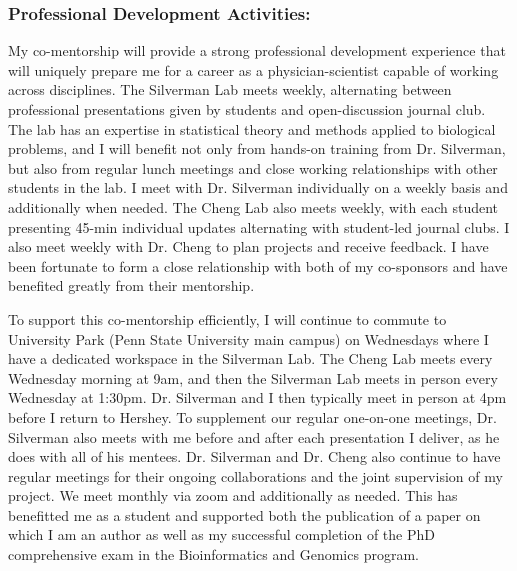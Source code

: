 \documentclass{NIHGrant}
\begin{document}
\subsubsection*{Professional Development Activities:}
My co-mentorship will provide a strong professional development experience that will uniquely prepare me for a career as a physician-scientist capable of working across disciplines. The Silverman Lab meets weekly, alternating between professional presentations given by students and open-discussion journal club. The lab has an expertise in statistical theory and methods applied to biological problems, and I will benefit not only from hands-on training from Dr. Silverman, but also from regular lunch meetings and close working relationships with other students in the lab. I meet with Dr. Silverman individually on a weekly basis and additionally when needed. The Cheng Lab also meets weekly, with each student presenting 45-min individual updates alternating with student-led journal clubs. I also meet weekly with Dr. Cheng to plan projects and receive feedback. I have been fortunate to form a close relationship with both of my co-sponsors and have benefited greatly from their mentorship.

To support this co-mentorship efficiently, I will continue to commute to University Park (Penn State University main campus) on Wednesdays where I have a dedicated workspace in the Silverman Lab. The Cheng Lab meets every Wednesday morning at 9am, and then the Silverman Lab meets in person every Wednesday at 1:30pm. Dr. Silverman and I then typically meet in person at 4pm before I return to Hershey. To supplement our regular one-on-one meetings, Dr. Silverman also meets with me before and after each presentation I deliver, as he does with all of his mentees. Dr. Silverman and Dr. Cheng also continue to have regular meetings for their ongoing collaborations and the joint supervision of my project. We meet monthly via zoom and additionally as needed. This has benefitted me as a student and supported both the publication of a paper on which I am an author as well as my successful completion of the PhD comprehensive exam in the Bioinformatics and Genomics program. %
\end{document}
